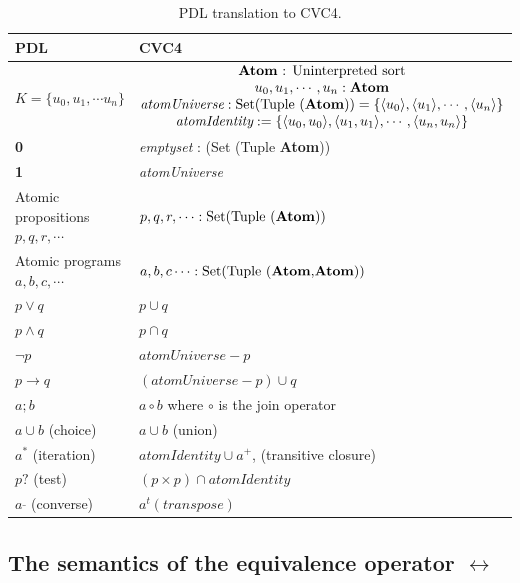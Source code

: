 \documentclass[12pt,a4paper]{article}
\begin{document}
\begin{table}[H]
\begin{center}
\begin{tabular}{ll} 
\toprule
PDL & CVC4 \\    
\midrule    
$K=\lbrace u_0, u_1, \cdots u_n \rbrace$ &  
$\begin{matrix}
\text{\textbf{Atom} : \text{Uninterpreted sort}} \\
u_0, u_1, \cdots, u_n: \textbf{Atom} \\
\textit{atomUniverse}: \text{Set(Tuple (\textbf{Atom}))} = \lbrace \langle u_0 \rangle, \langle u_1 \rangle, \cdots , \langle u_n \rangle \rbrace \\
\textit{atomIdentity}:  = \lbrace \langle u_0, u_0 \rangle, \langle u_1, u_1 \rangle, \cdots , \langle u_n, u_n \rangle \rbrace \\
\end{matrix}$ \\ \midrule   
\textbf{0} & \textit{emptyset} : (Set (Tuple \textbf{Atom})) \\
\textbf{1} & \textit{atomUniverse} \\
Atomic propositions $p, q, r, \cdots$ & $p, q, r, \cdots : \text{Set(Tuple (\textbf{Atom}))}$ \\
Atomic programs $a, b, c, \cdots$ & $a, b, c \cdots : \text{Set(Tuple (\textbf{Atom}$,$\textbf{Atom}))}$ \\
$p \vee q$ & $p \cup q$ \\
$p \wedge q$ & $p \cap q$ \\
$\neg p$ & $\textit{atomUniverse} - p$ \\
$p \rightarrow q$ & $(\textit{atomUniverse}- p)\cup q$ \\
$a;b$ & $a \circ b$ where $\circ$ is the join operator\\
$a \cup b$ (choice) & $a \cup b$ (union)\\
$a^*$ (iteration) & $\textit{atomIdentity} \cup a^+$, (transitive closure)\\
$p?$ (test) & $(p \times p) \cap \textit{atomIdentity}$\\
\color{red}
$a^{\_}$ (converse) & \color{red} $a^t (transpose)$\\

\bottomrule
\end{tabular}
\end{center}
\caption{PDL translation to CVC4.} \label{tab:translation}
\end{table}

\subsection{The semantics of the equivalence operator $\leftrightarrow$}
\end{document}
